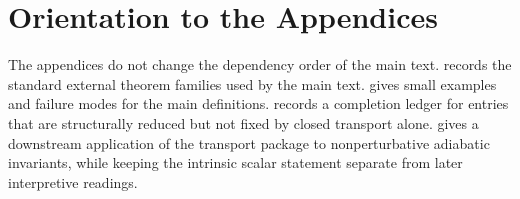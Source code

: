 \chapter*{Orientation to the Appendices}
\label{part:intro-appendix}
\begin{chapterorientation}
\end{chapterorientation}

The appendices do not change the dependency order of the main text.
 records the standard external theorem
families used by the main text.   gives
small examples and failure modes for the main definitions.
 records a completion ledger for
entries that are structurally reduced but not fixed by closed transport
alone.   gives a downstream application of the
transport package to nonperturbative adiabatic invariants, while keeping
the intrinsic scalar statement separate from later interpretive
readings.
